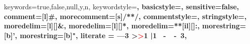 \expandafter\expandafter\expandafter\lstdefinelanguage
\expandafter{\language@yaml}
{
  keywords={true,false,null,y,n},
  keywordstyle=\color{darkgray}\bfseries,
  basicstyle=\YAMLkeystyle,                                 %
  sensitive=false,
  comment=[l]{\#},
  morecomment=[s]{/*}{*/},
  commentstyle=\color{purple}\ttfamily,
  stringstyle=\YAMLvaluestyle\ttfamily,
  moredelim=[l][\color{orange}]{\&},
  moredelim=[l][\color{magenta}]{*},
  moredelim=**[il][\YAMLcolonstyle{:}\YAMLvaluestyle]{:},   %
  morestring=[b]',
  morestring=[b]",
  literate =    {---}{{\ProcessThreeDashes}}3
                {>}{{\textcolor{red}\textgreater}}1     
                {|}{{\textcolor{red}\textbar}}1 
                {\ -\ }{{\mdseries\ -\ }}3,
}

\makeatother

\newcommand\ProcessThreeDashes{\llap{\color{cyan}\mdseries-{-}-}}




